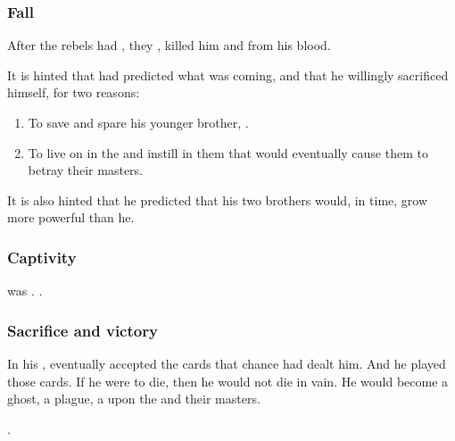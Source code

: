 \subsubsection{Fall}
After the \resphan{} rebels had , they , killed him and  from his blood.

It is hinted that \Nexagglachel{} had predicted what was coming, and that he willingly sacrificed himself, for two reasons:

\begin{enumerate}
 \item To save and spare his younger brother, \Ishnaruchaefir.
 \item To live on in the \resphain{} and instill in them  that would eventually cause them to betray their masters. 
\end{enumerate}

It is also hinted that he predicted that his two brothers would, in time, grow more powerful than he. 





\subsubsection{Captivity}
\Nexagglachel{} was . 
. 





\subsubsection{Sacrifice and victory}
In his , \Nexagglachel{} eventually accepted the cards that chance had dealt him. 
And he played those cards. 
If he were to die, then he would not die in vain. 
He would become a ghost, a plague, a  upon the \resphain{} and their \bane{} masters. 

\Nexagglachel {}. 





